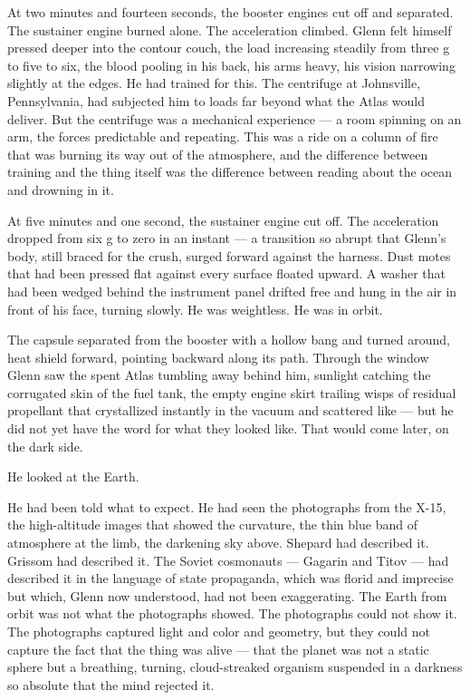\documentclass[12pt, letterpaper]{article}
\begin{document}
At two minutes and fourteen seconds, the booster engines cut off and separated. The sustainer engine burned alone. The acceleration climbed. Glenn felt himself pressed deeper into the contour couch, the load increasing steadily from three g to five to six, the blood pooling in his back, his arms heavy, his vision narrowing slightly at the edges. He had trained for this. The centrifuge at Johnsville, Pennsylvania, had subjected him to loads far beyond what the Atlas would deliver. But the centrifuge was a mechanical experience --- a room spinning on an arm, the forces predictable and repeating. This was a ride on a column of fire that was burning its way out of the atmosphere, and the difference between training and the thing itself was the difference between reading about the ocean and drowning in it.

At five minutes and one second, the sustainer engine cut off. The acceleration dropped from six g to zero in an instant --- a transition so abrupt that Glenn's body, still braced for the crush, surged forward against the harness. Dust motes that had been pressed flat against every surface floated upward. A washer that had been wedged behind the instrument panel drifted free and hung in the air in front of his face, turning slowly. He was weightless. He was in orbit.

The capsule separated from the booster with a hollow bang and turned around, heat shield forward, pointing backward along its path. Through the window Glenn saw the spent Atlas tumbling away behind him, sunlight catching the corrugated skin of the fuel tank, the empty engine skirt trailing wisps of residual propellant that crystallized instantly in the vacuum and scattered like --- but he did not yet have the word for what they looked like. That would come later, on the dark side.

He looked at the Earth.

He had been told what to expect. He had seen the photographs from the X-15, the high-altitude images that showed the curvature, the thin blue band of atmosphere at the limb, the darkening sky above. Shepard had described it. Grissom had described it. The Soviet cosmonauts --- Gagarin and Titov --- had described it in the language of state propaganda, which was florid and imprecise but which, Glenn now understood, had not been exaggerating. The Earth from orbit was not what the photographs showed. The photographs could not show it. The photographs captured light and color and geometry, but they could not capture the fact that the thing was alive --- that the planet was not a static sphere but a breathing, turning, cloud-streaked organism suspended in a darkness so absolute that the mind rejected it.
\end{document}
